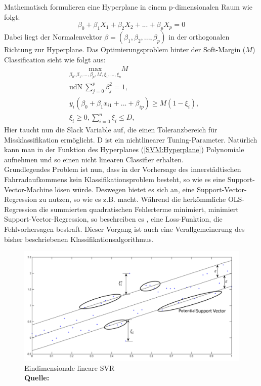 \documentclass[a4paper,12pt]{thesis}
\newcommand*{\captionsource}[2]{%
	\caption[{#1}]{%
		#1%
		\\\hspace{\linewidth}%
		\textbf{Quelle:} #2%
	}%
}
\begin{document}
Mathematisch formulieren \cite{James2013SVM} eine Hyperplane in einem p-dimensionalen Raum wie folgt:
\begin{equation}
	\label{SVM:Hyperplane}
	\beta_0 + \beta_1 X_1 + \beta_2 X_2 + ... + \beta_p X_p = 0
\end{equation}
Dabei liegt der Normalenvektor $\beta=(\beta_1, \beta_2, ..., \beta_p)$ in der orthogonalen Richtung zur Hyperplane. Das Optimierungsproblem hinter der Soft-Margin ($M$) Classification sieht wie folgt aus:
\begin{equation}
	\label{SVM:SoftMarginClassifier}
	\begin{aligned}
		&\underset{\beta_0, \beta_1, ... , \beta_p,M,\xi_1,...,\xi_n}{\text{max}}M \\
		&\text{udN}\: \sum_{j=0}^p\beta_j^2=1, \\
		&y_i(\beta_0 + \beta_1 x_{i1} + ... + \beta_{ip}) \geq M(1-\xi_i),\\
		&\xi_i \geq 0, \sum_{i=0}^n\xi_i \leq D,
	\end{aligned} 
\end{equation}
Hier taucht nun die Slack Variable auf, die einen Toleranzbereich für Missklassifikation ermöglicht. D ist ein nichtlinearer Tuning-Parameter. Natürlich kann man in der Funktion des Hyperplanes (\ref{SVM:Hyperplane}) Polynomiale aufnehmen und so einen nicht linearen Classifier erhalten.\\
Grundlegendes Problem ist nun, dass in der Vorhersage des innerstädtischen Fahrradaufkommens kein Klassifikationsproblem besteht, so wie es eine Support-Vector-Machine lösen würde. Deswegen bietet es sich an, eine Support-Vector-Regression zu nutzen, so wie es z.B. \cite{Holmgren2017} macht. Während die herkömmliche OLS-Regression die summierten quadratischen Fehlerterme minimiert, minimiert Support-Vector-Regression, so beschreiben es \cite{Awad2015}, eine Loss-Funktion, die Fehlvorhersagen bestraft. Dieser Vorgang ist auch eine Verallgemeinerung des bisher beschriebenen Klassifikationsalgorithmus.\\ 
\begin{figure}[!ht]
	\centering
	\includegraphics[width=\textwidth]{Plots/SVM3.png}
	\captionsource{Eindimensionale lineare SVR}{
		\cite{Awad2015}
	}
	\label{SVM3}
\end{figure}\\
\end{document}
